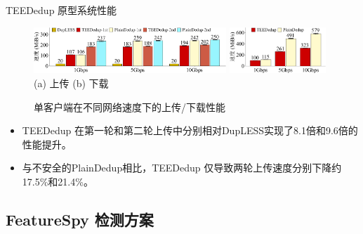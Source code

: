 \documentclass{beamer}
\newcommand{\sysnameS}{TEEDedup }
\newcommand{\sysnameF}{FeatureSpy }
\begin{document}
\begin{frame}{\sysnameS 原型系统性能}
    \begin{figure}[!htb]
        \centering
        \includegraphics[width=0.646\textwidth]{../pic/sgxdedup/plot/exp_b1/upload_network_speed_bar.pdf}
        \includegraphics[width=0.324\textwidth]{../pic/sgxdedup/plot/exp_b1/download_network_speed_bar.pdf}
        \\
        \hspace{1.1in} {\small (a) 上传} \hspace{1.4in}
        {\small (b) 下载}\\
        \caption{单客户端在不同网络速度下的上传/下载性能}
        \label{fig:sgxdedup-singleClientThroughput}
    \end{figure}

    \begin{itemize}
        \item \sysnameS 在第一轮和第二轮上传中分别相对DupLESS实现了8.1倍和9.6倍的性能提升。
        \item 与不安全的PlainDedup相比，\sysnameS 仅导致两轮上传速度分别下降约17.5\%和21.4\%。
    \end{itemize}
\end{frame}

\subsection{\sysnameF 检测方案}
\end{document}
